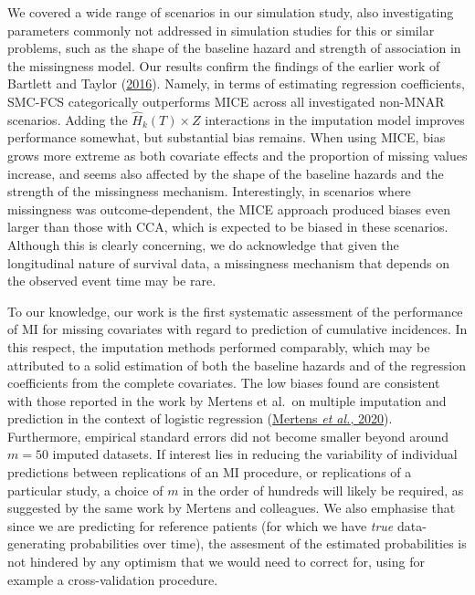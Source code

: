\documentclass[
  letterpaper,
  DIV=11,
  numbers=noendperiod]{scrreprt}
\begin{document}
We covered a wide range of scenarios in our simulation study, also
investigating parameters commonly not addressed in simulation studies
for this or similar problems, such as the shape of the baseline hazard
and strength of association in the missingness model. Our results
confirm the findings of the earlier work of Bartlett and Taylor
(\protect\hyperlink{ref-bartlettMissingCovariatesCompeting2016}{2016}).
Namely, in terms of estimating regression coefficients, SMC-FCS
categorically outperforms MICE across all investigated non-MNAR
scenarios. Adding the \(\hat{H}_{k}(T) \times Z\) interactions in the
imputation model improves performance somewhat, but substantial bias
remains. When using MICE, bias grows more extreme as both covariate
effects and the proportion of missing values increase, and seems also
affected by the shape of the baseline hazards and the strength of the
missingness mechanism. Interestingly, in scenarios where missingness was
outcome-dependent, the MICE approach produced biases even larger than
those with CCA, which is expected to be biased in these scenarios.
Although this is clearly concerning, we do acknowledge that given the
longitudinal nature of survival data, a missingness mechanism that
depends on the observed event time may be rare.

To our knowledge, our work is the first systematic assessment of the
performance of MI for missing covariates with regard to prediction of
cumulative incidences. In this respect, the imputation methods performed
comparably, which may be attributed to a solid estimation of both the
baseline hazards and of the regression coefficients from the complete
covariates. The low biases found are consistent with those reported in
the work by Mertens et al.~on multiple imputation and prediction in the
context of logistic regression
(\protect\hyperlink{ref-mertensConstructionAssessmentPrediction2020}{Mertens
\emph{et al.}, 2020}). Furthermore, empirical standard errors did not
become smaller beyond around \(m = 50\) imputed datasets. If interest
lies in reducing the variability of individual predictions between
replications of an MI procedure, or replications of a particular study,
a choice of \(m\) in the order of hundreds will likely be required, as
suggested by the same work by Mertens and colleagues. We also emphasise
that since we are predicting for reference patients (for which we have
\emph{true} data-generating probabilities over time), the assesment of
the estimated probabilities is not hindered by any optimism that we
would need to correct for, using for example a cross-validation
procedure.
\end{document}
